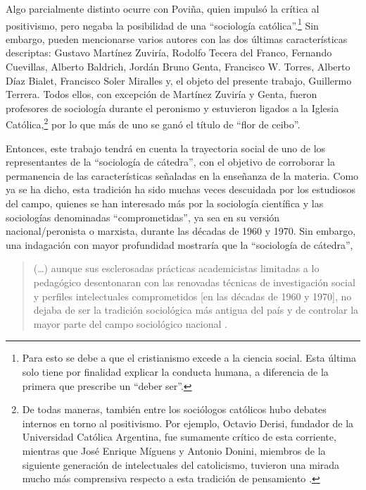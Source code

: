 Algo parcialmente distinto ocurre con Poviña, quien impulsó la crítica al positivismo, pero negaba la posibilidad de una \enquote{sociología católica}.\footnote{Para \textcite{1532-POVINA1955} esto se debe a que el cristianismo excede a la ciencia social. Esta última solo tiene por finalidad explicar la conducta humana, a diferencia de la primera que prescribe un \enquote{deber ser}.} Sin embargo, pueden mencionarse varios autores con las dos últimas características descriptas: Gustavo Martínez Zuviría, Rodolfo Tecera del Franco, Fernando Cuevillas, Alberto Baldrich, Jordán Bruno Genta, Francisco W. Torres, Alberto Díaz Bialet, Francisco Soler Miralles y, el objeto del presente trabajo, Guillermo Terrera. Todos ellos, con excepción de Martínez Zuviría y Genta, fueron profesores de sociología durante el peronismo y estuvieron ligados a la Iglesia Católica,\footnote{De todas maneras, también entre los sociólogos católicos hubo debates internos en torno al positivismo. Por ejemplo, Octavio Derisi, fundador de la Universidad Católica Argentina, fue sumamente crítico de esta corriente, mientras que José Enrique Míguens y Antonio Donini, miembros de la siguiente generación de intelectuales del catolicismo, tuvieron una mirada mucho más comprensiva respecto a esta tradición de pensamiento \parencite{281-ZANCA2006}.} por lo que más de uno se ganó el título de \enquote{flor de ceibo}.

Entonces, este trabajo tendrá en cuenta la trayectoria social de uno de los representantes de la \enquote{sociología de cátedra}, con el objetivo de corroborar la permanencia de las características señaladas en la enseñanza de la materia. Como ya se ha dicho, esta tradición ha sido muchas veces descuidada por los estudiosos del campo, quienes se han interesado más por la sociología científica y las sociologías denominadas \enquote{comprometidas}, ya sea en su versión nacional/peronista o marxista, durante las décadas de 1960 y 1970. Sin embargo, una indagación con mayor profundidad mostraría que la \enquote{sociología de cátedra},

\begin{quote}
(\dots) aunque sus esclerosadas prácticas academicistas limitadas a lo pedagógico desentonaran con las renovadas técnicas de investigación social y perfiles intelectuales comprometidos [en las décadas de 1960 y 1970], no dejaba de ser la tradición sociológica más antigua del país y de controlar la mayor parte del campo sociológico nacional \parencite[2-3]{1615-DIAZ2013}.
\end{quote}

